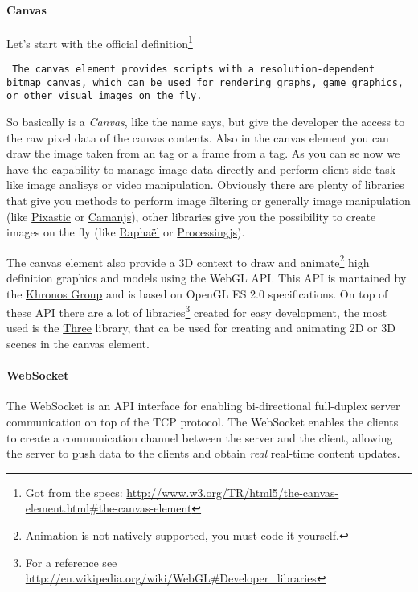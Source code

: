 \paragraph{Canvas}
	Let's start with the official definition\footnote{Got from the specs:
	\url{http://www.w3.org/TR/html5/the-canvas-element.html\#the-canvas-element}}
	\begin{quoting}\rm\tt
		The canvas element provides scripts with a resolution-dependent bitmap canvas, which can
		be used for rendering graphs, game graphics, or other visual images on the fly.
	\end{quoting}

	So basically is a \emph{Canvas}, like the name says, but give the developer the access to the raw pixel
	data of the canvas contents. Also in the canvas element you can draw the image taken from an 
	tag or a frame from a  tag. As you can se now we have the capability to manage image data
	directly and perform client-side task like image analisys or video manipulation.
	Obviously there are plenty of \js{} libraries that give you methods to perform image filtering or
	generally image manipulation (like \href{http://www.pixastic.com/}{Pixastic} or \href{http://camanjs.com/}{Camanjs}),
	other libraries give you the possibility to create images on the fly (like \href{http://raphaeljs.com/}{Raphaël}
	or \href{http://processingjs.org/}{Processingjs}).

	The canvas element also provide a 3D context to draw and animate\footnote{Animation is not natively supported, you
	must code it yourself.} high definition graphics and models using the WebGL API. This API is mantained by
	the \href{http://www.khronos.org/}{Khronos Group} and is based on OpenGL ES 2.0 specifications. On top of these
	API there are a lot of libraries\footnote{For a reference see \url{http://en.wikipedia.org/wiki/WebGL\#Developer_libraries}}
	created for easy development, the most used is the \href{http://mrdoob.github.com/three.js/}{Three}
	\js{} library, that ca be used for creating and animating 2D or 3D scenes in the canvas element.

\paragraph{WebSocket}
	The WebSocket is an API interface for enabling bi-directional full-duplex server communication on top of the \ac{TCP} protocol.
	The WebSocket enables the clients to create a communication channel between the server and the client, allowing the server
	to \b{push} data to the clients and obtain \emph{real} real-time content updates.

